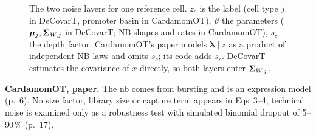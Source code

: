 \documentclass[11pt,a4paper]{article}
\begin{document}
\begin{figure}[tbp]
\centering
{}
\caption{The two noise layers for one reference cell. $z_c$ is the label (cell type $j$ in DeCovarT,
promoter basin in CardamomOT), $\vartheta$ the parameters ($\bm{\mu}_j,\bm{\Sigma}_{W,j}$ in DeCovarT; NB shapes and rates
in CardamomOT), $s_c$ the depth factor. CardamomOT's paper models $\bm\lambda\mid z$ as a product of
independent NB laws and omits $s_c$; its code adds $s_c$. DeCovarT estimates the covariance of $x$
directly, so both layers enter $\bm{\Sigma}_{W,j}$.}
\label{fig:layers}
\end{figure}

\textbf{CardamomOT, paper.} The \gls{nb} comes from bursting and is an expression model (p.~6). No size
factor, library size or capture term appears in Eqs~3--4; technical noise is examined only as a
robustness test with simulated binomial dropout of 5--90\,\% (p.~17).
\end{document}
